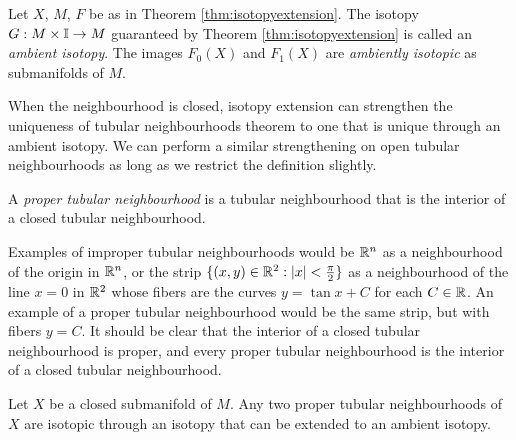 \begin{defn}
	\label{def:ambientisotopy}
	Let $X$, $M$, $F$ be as in Theorem \ref{thm:isotopyextension}.
	The isotopy $G:M\times\mathbb{I}\to M$ guaranteed by Theorem \ref{thm:isotopyextension} is called an \emph{ambient isotopy}.
	The images $F_0(X)$ and $F_1(X)$ are \emph{ambiently isotopic} as submanifolds of $M$.
\end{defn}

When the neighbourhood is closed, isotopy extension can strengthen the uniqueness of tubular neighbourhoods theorem to one that is unique through an ambient isotopy.
We can perform a similar strengthening on open tubular neighbourhoods as long as we restrict the definition slightly.

\begin{defn}
	A \emph{proper tubular neighbourhood} is a tubular neighbourhood that is the interior of a closed tubular neighbourhood.
\end{defn}

Examples of improper tubular neighbourhoods would be $\mathbb{R}^n$ as a neighbourhood of the origin in $\mathbb{R}^n$, or the strip $\{ (x,y)\in \mathbb{R}^2 : |x|< \frac{\pi}{2}\}$ as a neighbourhood of the line $x=0$ in $\mathbb{R}^2$ whose fibers are the curves $y=\tan x + C$ for each $C\in\mathbb{R}$.
An example of a proper tubular neighbourhood would be the same strip, but with fibers $y=C$.
It should be clear that the interior of a closed tubular neighbourhood is proper, and every proper tubular neighbourhood is the interior of a closed tubular neighbourhood.

\begin{theorem}
	Let $X$ be a closed submanifold of $M$.
	Any two proper tubular neighbourhoods of $X$ are isotopic through an isotopy that can be extended to an ambient isotopy.
\end{theorem}
